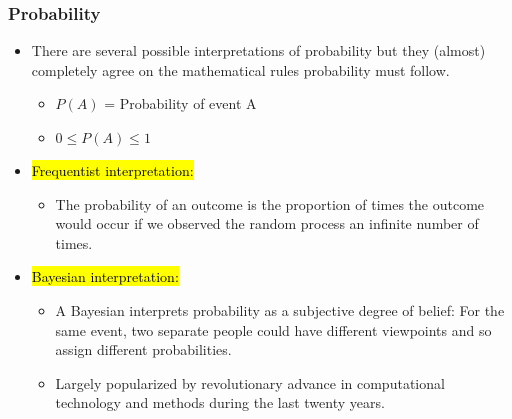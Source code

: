 \documentclass[slidestop,compress,mathserif]{beamer}
\begin{document}

\begin{frame}
\frametitle{Probability}

\begin{itemize}

\item There are several possible interpretations of probability but they (almost) completely agree on the mathematical rules probability must follow.
\begin{itemize}
\item $P(A)$ = Probability of event A 
\item $0 \le P(A) \le 1$
\end{itemize}

\pause

\item \hl{Frequentist interpretation:} 
\begin{itemize}
\item The probability of an outcome is the proportion of times the outcome would occur if we observed the random process an infinite number of times.
\end{itemize}

\pause

\item \hl{Bayesian interpretation:} 
\begin{itemize}
\item  A Bayesian interprets probability as a subjective degree of belief: For the same event, two separate people could have different viewpoints and so assign different probabilities.
\item Largely popularized by revolutionary advance in computational technology and methods during the last twenty years.
\end{itemize}

\end{itemize}

\end{frame}




\end{document}
